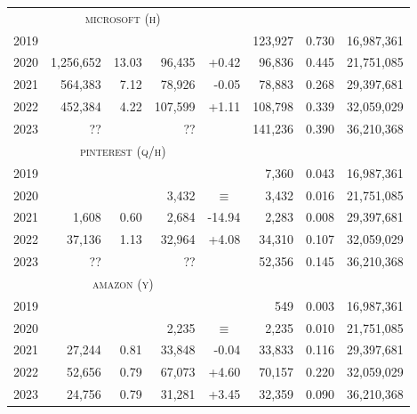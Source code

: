 \documentclass[nonacm,screen]{acmart}
\newcommand\same{\multicolumn{1}{c}{$\equiv$}}
\newcommand\missing{\multicolumn{1}{r}{??}}
\begin{document}
\begin{itemize}
\begin{table}
\begin{tabular}{r@{\hskip 1.5em}rrr r@{\hskip 1.5em}rrr}
& \multicolumn{3}{c}{\textsc{\MakeLowercase{Microsoft (H)}}} & & & & \\ \cmidrule{2-4}
\color{lowlight} 2019 &             &        &            &         &    123,927 &  0.730 & \color{lowlight} 16,987,361 \\
\color{lowlight} 2020 &   1,256,652 &  13.03 &     96,435 &   +0.42 &     96,836 &  0.445 & \color{lowlight} 21,751,085 \\
\color{lowlight} 2021 &     564,383 &   7.12 &     78,926 &   -0.05 &     78,883 &  0.268 & \color{lowlight} 29,397,681 \\
\color{lowlight} 2022 &     452,384 &   4.22 &    107,599 &   +1.11 &    108,798 &  0.339 & \color{lowlight} 32,059,029 \\
\color{lowlight} 2023 &    \missing &        &   \missing &         &    141,236 &  0.390 & \color{lowlight} 36,210,368 \\[2ex]

& \multicolumn{3}{c}{\textsc{\MakeLowercase{Pinterest (Q/H)}}} & & & & \\ \cmidrule{2-4}
\color{lowlight} 2019 &             &        &            &         &      7,360 &  0.043 & \color{lowlight} 16,987,361 \\
\color{lowlight} 2020 &             &        &      3,432 &   \same &      3,432 &  0.016 & \color{lowlight} 21,751,085 \\
\color{lowlight} 2021 &       1,608 &   0.60 &      2,684 &  -14.94 &      2,283 &  0.008 & \color{lowlight} 29,397,681 \\
\color{lowlight} 2022 &      37,136 &   1.13 &     32,964 &   +4.08 &     34,310 &  0.107 & \color{lowlight} 32,059,029 \\
\color{lowlight} 2023 &    \missing &        &   \missing &         &     52,356 &  0.145 & \color{lowlight} 36,210,368 \\[2ex]

& \multicolumn{3}{c}{\textsc{\MakeLowercase{Amazon (Y)}}} & & & & \\ \cmidrule{2-4}
\color{lowlight} 2019 &             &        &           &          &        549 &  0.003 & \color{lowlight} 16,987,361 \\
\color{lowlight} 2020 &             &        &     2,235 &    \same &      2,235 &  0.010 & \color{lowlight} 21,751,085 \\
\color{lowlight} 2021 &      27,244 &   0.81 &    33,848 &    -0.04 &     33,833 &  0.116 & \color{lowlight} 29,397,681 \\
\color{lowlight} 2022 &      52,656 &   0.79 &    67,073 &    +4.60 &     70,157 &  0.220 & \color{lowlight} 32,059,029 \\
\color{lowlight} 2023 &      24,756 &   0.79 &    31,281 &    +3.45 &     32,359 &  0.090 & \color{lowlight} 36,210,368 \\[2ex]


\end{tabular}
\end{table}
\end{itemize}
\end{document}
